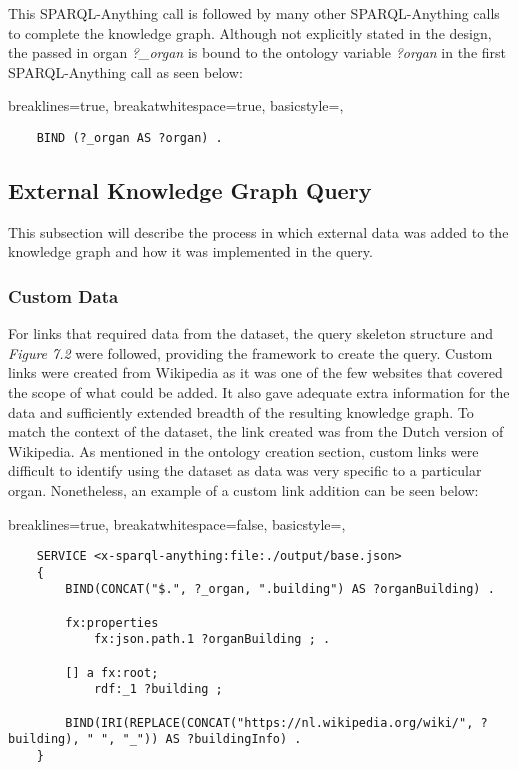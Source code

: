 This SPARQL-Anything call is followed by many other SPARQL-Anything calls to complete the knowledge graph. Although not explicitly stated in the design, the passed in organ \textit{?\_organ} is bound to the ontology variable \textit{?organ} in the first SPARQL-Anything call as seen below:

\lstset
{
    breaklines=true,
    breakatwhitespace=true,
    basicstyle=\ttfamily,
}
\begin{lstlisting}
    BIND (?_organ AS ?organ) .
\end{lstlisting}

\subsection{External Knowledge Graph Query}
\hspace*{0.5cm} This subsection will describe the process in which external data was added to the knowledge graph and how it was implemented in the query. 

\subsubsection{Custom Data}
\hspace*{0.5cm} For links that required data from the dataset, the query skeleton structure and \textit{Figure 7.2} were followed, providing the framework to create the query. Custom links were created from Wikipedia as it was one of the few websites that covered the scope of what could be added. It also gave adequate extra information for the data and sufficiently extended breadth of the resulting knowledge graph. To match the context of the dataset, the link created was from the Dutch version of Wikipedia. As mentioned in the ontology creation section, custom links were difficult to identify using the dataset as data was very specific to a particular organ. Nonetheless, an example of a custom link addition can be seen below:

\lstset
{
    breaklines=true,
    breakatwhitespace=false,
    basicstyle=\ttfamily,
}
\begin{lstlisting}
    SERVICE <x-sparql-anything:file:./output/base.json>
    {
        BIND(CONCAT("$.", ?_organ, ".building") AS ?organBuilding) .
    
        fx:properties
            fx:json.path.1 ?organBuilding ; .
    
        [] a fx:root; 
            rdf:_1 ?building ;
    
        BIND(IRI(REPLACE(CONCAT("https://nl.wikipedia.org/wiki/", ?building), " ", "_")) AS ?buildingInfo) . 
    } 
\end{lstlisting}


